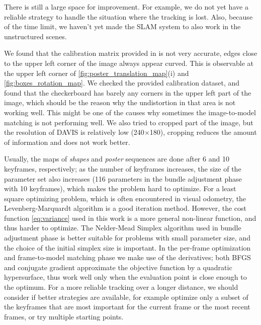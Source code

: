 There is still a large space for improvement. For example, we do not
yet have a reliable strategy to handle the situation where the
tracking is lost. Also, because of the time limit, we haven't yet made
the SLAM system to also work in the unstructured scenes.

We found that the calibration matrix provided in
\citep{mueggler2017event} is not very accurate, edges close to the
upper left corner of the image always appear curved. This is
observable at the upper left corner of
\cref{fig:poster_translation_map}(i) and
\cref{fig:boxes_rotation_map}. We checked the provided calibration
dataset, and found that the checkerboard has barely any corners in the
upper left part of the image, which should be the reason why the
undistortion in that area is not working well. This might be one of
the causes why sometimes the image-to-model matching is not performing
well. We also tried to cropped part of the image, but the resolution
of DAVIS is relatively low (240$\times$180), cropping reduces the
amount of information and does not work better.

Usually, the maps of \emph{shapes} and \emph{poster} sequences are
done after 6 and 10 keyframes, respectively; as the number of
keyframes increases, the size of the parameter set also increases (116
parameters in the bundle adjustment phase with 10 keyframes), which
makes the problem hard to optimize. For a least square optimizing
problem, which is often encountered in visual odometry, the
Levenberg-Marquardt algorithm\citep{press1988numerical} is a good
iteration method. However, the cost function \cref{eq:variance} used
in this work is a more general non-linear function, and thus harder to
optimize. The Nelder-Mead Simplex algorithm\citep{nelder1965simplex}
used in bundle adjustment phase is better suitable for problems with
small parameter size, and the choice of the initial simplex size is
important. In the per-frame optimization and frame-to-model matching
phase we make use of the derivatives; both BFGS and conjugate gradient
approximate the objective function by a quadratic hypersurface, thus
work well only when the evaluation point is close enough to the
optimum. For a more reliable tracking over a longer distance, we
should consider if better strategies are available, for example
optimize only a subset of the keyframes that are most important for
the current frame or the most recent frames, or try multiple starting
points.
